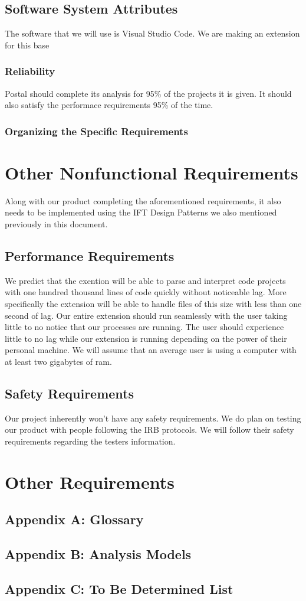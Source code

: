 \documentclass[letterpaper,10pt,titlepage,draftclsnofoot,onecolumn,onesided] {IEEEtran}
\begin{document}
\subsection{Software System Attributes}
The software that we will use is Visual Studio Code. We are making an extension for this base

\subsubsection{Reliability}
Postal should complete its analysis for 95\% of the projects it is given. It should also satisfy the performace requirements 95\% of the time.   

\subsubsection{Organizing the Specific Requirements}

\section{Other Nonfunctional Requirements}
Along with our product completing the aforementioned requirements, it also needs to be implemented using the IFT Design Patterns we also mentioned previously in this document. 

\subsection{Performance Requirements} 
We predict that the exention will be able to parse and interpret code projects with one hundred thousand lines of code quickly without noticeable lag. 
More specifically the extension will be able to handle files of this size with less than one second of lag.
Our entire extension should run seamlessly with the user taking little to no notice that our processes are running. 
The user should experience little to no lag while our extension is running depending on the power of their personal machine.
We will assume that an average user is using a computer with at least two gigabytes of ram. 

\subsection{Safety Requirements}
Our project inherently won't have any safety requirements. 
We do plan on testing our product with people following the IRB protocols.
We will follow their safety requirements regarding the testers information.

\section{Other Requirements}

\subsection{Appendix A: Glossary}

\subsection{Appendix B: Analysis Models}

\subsection{Appendix C: To Be Determined List}
\end{document}
